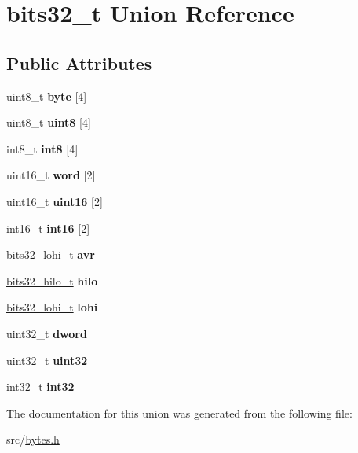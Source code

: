 \hypertarget{unionbits32__t}{}\section{bits32\+\_\+t Union Reference}
\label{unionbits32__t}
\subsection*{Public Attributes}
\begin{DoxyCompactItemize}
\item 
\hypertarget{unionbits32__t_abe0797e0eb5f1bf589b9c038a78bfbdc}{}\label{unionbits32__t_abe0797e0eb5f1bf589b9c038a78bfbdc} 
uint8\+\_\+t {\bfseries byte} \mbox{[}4\mbox{]}
\item 
\hypertarget{unionbits32__t_ade6279a4e44ee0b5ea958f63dbf4388d}{}\label{unionbits32__t_ade6279a4e44ee0b5ea958f63dbf4388d} 
uint8\+\_\+t {\bfseries uint8} \mbox{[}4\mbox{]}
\item 
\hypertarget{unionbits32__t_ac3774810575fe4c355270f7292df3035}{}\label{unionbits32__t_ac3774810575fe4c355270f7292df3035} 
int8\+\_\+t {\bfseries int8} \mbox{[}4\mbox{]}
\item 
\hypertarget{unionbits32__t_a6463efc291982c8a0a0e5fddc4dae8d8}{}\label{unionbits32__t_a6463efc291982c8a0a0e5fddc4dae8d8} 
uint16\+\_\+t {\bfseries word} \mbox{[}2\mbox{]}
\item 
\hypertarget{unionbits32__t_a9b517f749570fa0505ecb07a59d7de04}{}\label{unionbits32__t_a9b517f749570fa0505ecb07a59d7de04} 
uint16\+\_\+t {\bfseries uint16} \mbox{[}2\mbox{]}
\item 
\hypertarget{unionbits32__t_afdc70028d0a79d25b72b5674aa9123dd}{}\label{unionbits32__t_afdc70028d0a79d25b72b5674aa9123dd} 
int16\+\_\+t {\bfseries int16} \mbox{[}2\mbox{]}
\item 
\hypertarget{unionbits32__t_ab3f205911435f4da69f077493a814cb4}{}\label{unionbits32__t_ab3f205911435f4da69f077493a814cb4} 
\hyperlink{structbits32__lohi__s}{bits32\+\_\+lohi\+\_\+t} {\bfseries avr}
\item 
\hypertarget{unionbits32__t_acb8df3f2372a628f21d4ba07e471ac15}{}\label{unionbits32__t_acb8df3f2372a628f21d4ba07e471ac15} 
\hyperlink{structbits32__hilo__s}{bits32\+\_\+hilo\+\_\+t} {\bfseries hilo}
\item 
\hypertarget{unionbits32__t_ad7cf7f31700e142c10e2e60c27131d69}{}\label{unionbits32__t_ad7cf7f31700e142c10e2e60c27131d69} 
\hyperlink{structbits32__lohi__s}{bits32\+\_\+lohi\+\_\+t} {\bfseries lohi}
\item 
\hypertarget{unionbits32__t_a894d610b65f05a414d2377e9e46b1c1a}{}\label{unionbits32__t_a894d610b65f05a414d2377e9e46b1c1a} 
uint32\+\_\+t {\bfseries dword}
\item 
\hypertarget{unionbits32__t_ae399904fbef319292e29946f49d6843c}{}\label{unionbits32__t_ae399904fbef319292e29946f49d6843c} 
uint32\+\_\+t {\bfseries uint32}
\item 
\hypertarget{unionbits32__t_aa272b73bd27c8d36e55668bf8d74682c}{}\label{unionbits32__t_aa272b73bd27c8d36e55668bf8d74682c} 
int32\+\_\+t {\bfseries int32}
\end{DoxyCompactItemize}


The documentation for this union was generated from the following file\+:\begin{DoxyCompactItemize}
\item 
src/\hyperlink{bytes_8h}{bytes.\+h}\end{DoxyCompactItemize}
